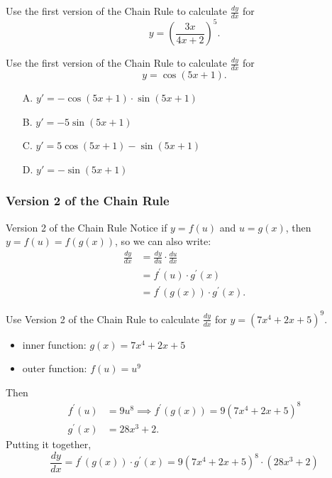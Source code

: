 \documentclass[cal1spr16Lectures.tex]{subfiles}
\begin{document}
\begin{frame}
\begin{exe} Use the first version of the Chain Rule to calculate $\textstyle\frac{dy}{dx}$ for 
\[y=\left( \frac{3x}{4x+2} \right)^5.\]
\end{exe}
\end{frame}

\begin{frame}
\begin{exe}
Use the first version of the Chain Rule to calculate $\textstyle\frac{dy}{dx}$ for
\[
y=\cos{(5x+1).}
\]
\begin{itemize}
\item[A. ] $y'=-\cos{(5x+1)}\cdot\sin{(5x+1)}$
\item[B. ] $y'=-5\sin{(5x+1)}$
\item[C. ] $y'=5\cos{(5x+1)}-\sin{(5x+1)}$
\item[D. ] $y'=-\sin{(5x+1)}$
\end{itemize}
\end{exe}
\end{frame}

\subsubsection{Version 2 of the Chain Rule}

\begin{frame}{\small Version 2 of the Chain Rule}
Notice if $y=f(u)$ and $u=g(x)$, then $y=f(u)=f(g(x))$, so we can also write:
\begin{align*}
\frac{dy}{dx} &= \frac{dy}{du} \cdot \frac{du}{dx} \\[0.75pc]
 &= f^{\prime}(u) \cdot g^{\prime}(x) \\[0.75pc]
 &= f^{\prime}(g(x)) \cdot g^{\prime}(x).
\end{align*}
\end{frame}

\begin{frame}\footnotesize
\begin{ex} Use Version 2 of the Chain Rule to calculate $\textstyle\frac{dy}{dx}$ for $y=(7x^4+2x+5)^9$. \end{ex}
\begin{itemize}
\item inner function: $g(x)=7x^4+2x+5$ 
\item outer function: $f(u)=u^9$
\end{itemize}
Then
\begin{align*}
f^{\prime}(u) &= 9u^8 \implies f^{\prime}(g(x))=9(7x^4+2x+5)^8 \\
g^{\prime}(x) &=28x^3+2.
\end{align*}
Putting it together,
\[\frac{dy}{dx}=f^{\prime}(g(x)) \cdot g^{\prime}(x) = 9(7x^4+2x+5)^8 \cdot (28x^3+2)\]
\end{frame}
\end{document}
